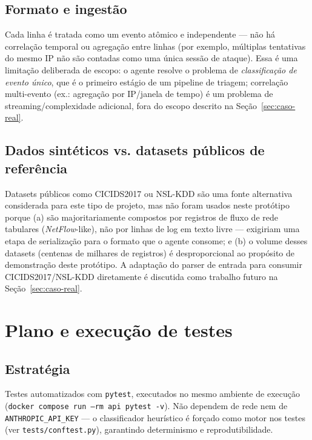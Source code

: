 \documentclass[11pt,a4paper]{article}
\begin{document}
\subsection{Formato e ingestão}

Cada linha é tratada como um evento atômico e independente --- não há correlação
temporal ou agregação entre linhas (por exemplo, múltiplas tentativas do mesmo IP não
são contadas como uma única sessão de ataque). Essa é uma limitação deliberada de
escopo: o agente resolve o problema de \emph{classificação de evento único}, que é o
primeiro estágio de um pipeline de triagem; correlação multi-evento (ex.: agregação por
IP/janela de tempo) é um problema de streaming/complexidade adicional, fora do escopo
descrito na Seção~\ref{sec:caso-real}.

\subsection{Dados sintéticos vs. datasets públicos de referência}

Datasets públicos como CICIDS2017 ou NSL-KDD são uma fonte alternativa considerada para
este tipo de projeto, mas não foram usados neste protótipo porque (a) são majoritariamente compostos por registros
de fluxo de rede tabulares (\emph{NetFlow}-like), não por linhas de log em texto livre
--- exigiriam uma etapa de serialização para o formato que o agente consome; e (b) o
volume desses datasets (centenas de milhares de registros) é desproporcional ao
propósito de demonstração deste protótipo. A adaptação do parser de entrada para
consumir CICIDS2017/NSL-KDD diretamente é discutida como trabalho futuro na
Seção~\ref{sec:caso-real}.

\section{Plano e execução de testes}

\subsection{Estratégia}

Testes automatizados com \texttt{pytest}, executados no mesmo ambiente de execução
(\texttt{docker compose run --rm api pytest -v}). Não dependem de rede nem de
\verb|ANTHROPIC_API_KEY| --- o classificador heurístico é forçado como motor nos
testes (ver \texttt{tests/conftest.py}), garantindo determinismo e reprodutibilidade.
\end{document}
